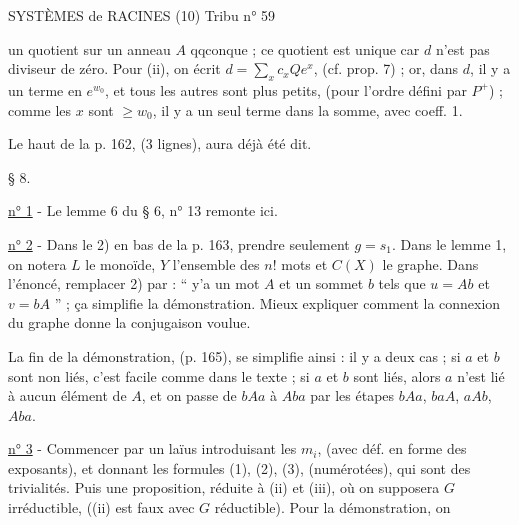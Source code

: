 SYSTÈMES de RACINES (10) \hfill Tribu n° 59

un quotient sur un anneau $A$ qqconque ; ce quotient est unique car $d$ n'est pas diviseur de zéro. Pour (ii), on écrit $d=\sum_x c_x Qe^x$, (cf. prop. 7) ; or, dans $d$, il y a un terme en $e^{w_0}$, et tous les autres sont plus petits, (pour l'ordre défini par $P^+$) ; comme les $x$ sont $\geq w_0$, il y a un seul terme dans la somme, avec coeff. 1.

Le haut de la p. 162, (3 lignes), aura déjà été dit.

§ 8. 

\uline{n° 1} - Le lemme 6 du § 6, n° 13 remonte ici.

\uline{n° 2} - Dans le 2) en bas de la p. 163, prendre seulement $g=s_1$. Dans le lemme 1, on notera $L$ le monoïde, $Y$ l'ensemble des $n!$ mots et $C(X)$ le graphe. Dans l'énoncé, remplacer 2) par : `` y'a un mot $A$ et un sommet $b$ tels que $u=Ab$ et $v=bA$ '' ; ça simplifie la démonstration. Mieux expliquer comment la connexion du graphe donne la conjugaison voulue.

La fin de la démonstration, (p. 165), se simplifie ainsi : il y a deux cas ; si $a$ et $b$ sont non liés, c'est facile comme dans le texte ; si $a$ et $b$ sont liés, alors $a$ n'est lié à aucun élément de $A$, et on passe de $bAa$ à $Aba$ par les étapes $bAa$, $baA$, $aAb$, $Aba$.

\uline{n° 3} - Commencer par un laïus introduisant les $m_i$, (avec déf. en forme des exposants), et donnant les formules (1), (2), (3), (numérotées), qui sont des trivialités. Puis une proposition, réduite à (ii) et (iii), où on supposera $G$ irréductible, ((ii) est faux avec $G$ réductible). Pour la démonstration, on
